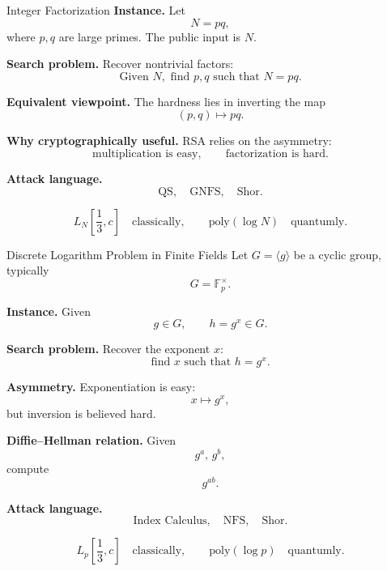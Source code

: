 \documentclass[aspectratio=169]{beamer}
\begin{document}
	\begin{frame}{Integer Factorization}
		\textbf{Instance.}
		Let
		\[
		N = pq,
		\]
		where $p,q$ are large primes. The public input is $N$.
		
		\vspace{0.4em}
		\textbf{Search problem.}
		Recover nontrivial factors:
		\[
		\text{Given } N, \text{ find } p,q \text{ such that } N=pq.
		\]
		
		\vspace{0.4em}
		\textbf{Equivalent viewpoint.}
		The hardness lies in inverting the map
		\[
		(p,q) \longmapsto pq.
		\]
		
		\vspace{0.4em}
		\textbf{Why cryptographically useful.}
		RSA relies on the asymmetry:
		\[
		\text{multiplication is easy}, \qquad \text{factorization is hard}.
		\]
		
		\vspace{0.4em}
		\textbf{Attack language.}
		\[
		\text{QS}, \quad \text{GNFS}, \quad \text{Shor}.
		\]
		
		\[
		L_N\!\left[\frac13,c\right]
		\quad \text{classically}, 
		\qquad
		\mathrm{poly}(\log N)
		\quad \text{quantumly}.
		\]
	\end{frame}
	
	
	\begin{frame}{Discrete Logarithm Problem in Finite Fields}
		Let $G = \langle g \rangle$ be a cyclic group, typically
		\[
		G = \mathbb{F}_p^\times.
		\]
		
		\textbf{Instance.}
		Given
		\[
		g \in G, \qquad h = g^x \in G.
		\]
		
		\textbf{Search problem.}
		Recover the exponent $x$:
		\[
		\text{find } x \text{ such that } h=g^x.
		\]
		
		\vspace{0.4em}
		\textbf{Asymmetry.}
		Exponentiation is easy:
		\[
		x \mapsto g^x,
		\]
		but inversion is believed hard.
		
		\vspace{0.4em}
		\textbf{Diffie--Hellman relation.}
		Given
		\[
		g^a,\, g^b,
		\]
		compute
		\[
		g^{ab}.
		\]
		
		\vspace{0.4em}
		\textbf{Attack language.}
		\[
		\text{Index Calculus}, \quad \text{NFS}, \quad \text{Shor}.
		\]
		
		\[
		L_p\!\left[\frac13,c\right]
		\quad \text{classically}, 
		\qquad
		\mathrm{poly}(\log p)
		\quad \text{quantumly}.
		\]
	\end{frame}
	
\end{document}
